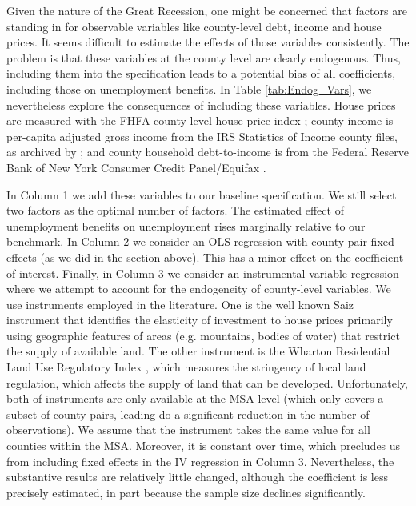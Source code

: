 \documentclass[12pt]{article}
\newcommand{\1}{\mathbf{1}}
\begin{document}
\begin{appendix}
Given the nature of the Great Recession, one might be concerned that factors are standing in for observable variables like county-level debt, income and house prices. It seems difficult to estimate the effects of those variables consistently. The problem is that these variables at the county level are clearly endogenous. Thus, including them into the specification leads to a potential bias of all coefficients, including those on unemployment benefits. In Table \ref{tab:Endog_Vars}, we nevertheless explore the consequences of including these variables. House prices are measured with the FHFA county-level house price index \citep{data:fhfa-hpi}; county income is per-capita adjusted gross income from the IRS Statistics of Income county files, as archived by \citet{data:kmv-jpube}; and county household debt-to-income is from the Federal Reserve Bank of New York Consumer Credit Panel/Equifax \citep{data:nyfed-ccp}.

In Column 1 we add these variables to our baseline specification. We still select two factors as the optimal number of factors. The estimated effect of unemployment benefits on unemployment rises marginally relative to our benchmark. In Column 2 we consider an OLS regression with county-pair fixed effects (as we did in the section above). This has a minor effect on the coefficient of interest. Finally, in Column 3 we consider an instrumental variable regression where we attempt to account for the endogeneity of county-level variables. We use instruments employed in the literature. One is the well known Saiz instrument \citep{saiz:10,data:saiz-qje} that identifies the elasticity of investment to house prices primarily using geographic features of areas (e.g. mountains, bodies of water) that restrict the supply of available land. The other instrument is the Wharton Residential Land Use Regulatory Index \citep{gyourko+saiz+summers:08}, which measures the stringency of local land regulation, which affects the supply of land that can be developed. Unfortunately, both of instruments are only available at the MSA level (which only covers a subset of county pairs, leading do a significant reduction in the number of observations). We assume that the instrument takes the same value for all counties within the MSA. Moreover, it is constant over time, which precludes us from including fixed effects in the IV regression in Column 3. Nevertheless, the substantive results are relatively little changed, although the coefficient is less precisely estimated, in part because the sample size declines significantly. 


\end{appendix}
\end{document}

